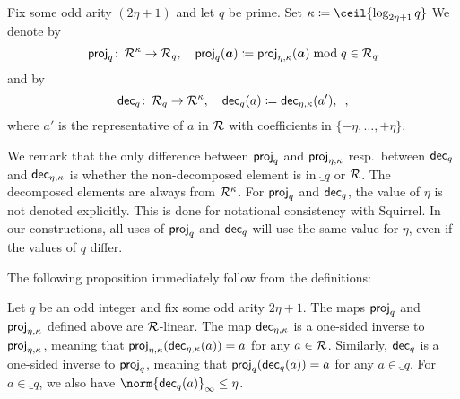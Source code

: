 %
\begin{definition}\label{def:proj_decomp_q}
Fix some odd arity $(2\eta+1)$ and let $q$ be prime.
Set $\limbs \coloneqq \ceil{\log_{2\eta+1}q}$
We denote by
\[
 \mathsf{proj}_{q}\colon\,\mathcal{R}^\kappa \to \mathcal{R}_q,\quad \mathsf{proj}_{q}(\boldsymbol{a}) \coloneqq \mathsf{proj}_{\eta,\kappa}(\boldsymbol{a})\bmod q\in\mathcal{R}_q
\]
and by
\[
 \mathsf{dec}_{q}\colon\,\mathcal{R}_q \to \mathcal{R}^\kappa,\quad \mathsf{dec}_{q}(a) \coloneqq \mathsf{dec}_{\eta,\kappa}(a'),\enspace,
\]
where $a'$ is the representative of $a$ in $\mathcal{R}$ with coefficients in $\{-\eta,\ldots,+\eta\}$.
\end{definition}
We remark that the only difference between $\mathsf{proj}_{q}$ and $\mathsf{proj}_{\eta,\kappa}$ resp.\ between $\mathsf{dec}_{q}$ and $\mathsf{dec}_{\eta,\kappa}$ is whether the non-decomposed element is in $\ring_q$ or $\mathcal{R}$.
The decomposed elements are always from $\mathcal{R}^\kappa$.
For $\mathsf{proj}_{q}$ and $\mathsf{dec}_{q}$, the value of $\eta$ is not denoted explicitly.
This is done for notational consistency with Squirrel.
In our constructions, all uses of $\mathsf{proj}_{q}$ and $\mathsf{dec}_{q}$ will use the same value for $\eta$, even if the values of $q$ differ.


The following proposition immediately follow from the definitions:
\begin{proposition}\label{prop:projanddecomp}
Let $q$ be an odd integer and fix some odd arity $2\eta+1$. The maps $\mathsf{proj}_{q}$ and $\mathsf{proj}_{\eta,\kappa}$ defined above are $\mathcal{R}$-linear.
The map $\mathsf{dec}_{\eta,\kappa}$ is a one-sided inverse to $\mathsf{proj}_{\eta,\kappa}$, meaning that $\mathsf{proj}_{\eta,\kappa}(\mathsf{dec}_{\eta,\kappa}(a)) = a$ for any $a\in\mathcal{R}$.
Similarly, $\mathsf{dec}_{q}$ is a one-sided inverse to $\mathsf{proj}_{q}$, meaning that $\mathsf{proj}_{q}(\mathsf{dec}_{q}(a))= a$ for any $a\in\ring_q$.
For $a\in\ring_q$, we also have $\norm{\decompmod{q}(a)}_{\infty} \leq \eta$.
\end{proposition}

